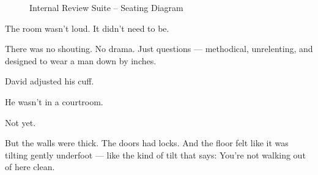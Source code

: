 \medskip

\begin{figure}[H]
  \centering
  \begin{adjustbox}{width=0.9\linewidth}
  \end{adjustbox}
  \caption{Internal Review Suite -- Seating Diagram}
\end{figure}

\medskip

The room wasn’t loud. It didn’t need to be.

There was no shouting. No drama. Just questions — methodical, unrelenting, and designed to wear a man down by inches.

David adjusted his cuff.

He wasn’t in a courtroom.

Not yet.

But the walls were thick. The doors had locks. And the floor felt like it was tilting gently underfoot — like the kind of tilt that says:
You’re not walking out of here clean.

\medskip

